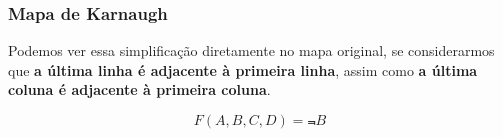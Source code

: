 \documentclass{beamer}
\begin{document}
\begin{frame}
\frametitle{Mapa de Karnaugh}

Podemos ver essa simplificação diretamente no mapa original,
se considerarmos que \textbf{a última linha é adjacente à
primeira linha}, assim como \textbf{a última coluna é adjacente à
primeira coluna}.

\pause

\vspace{12pt}

\hspace*{\fill}%
%
%
%
\hspace*{\fill}

\pause\pause

$$F(A,B,C,D) = \Not{B}$$

\end{frame}
\end{document}
